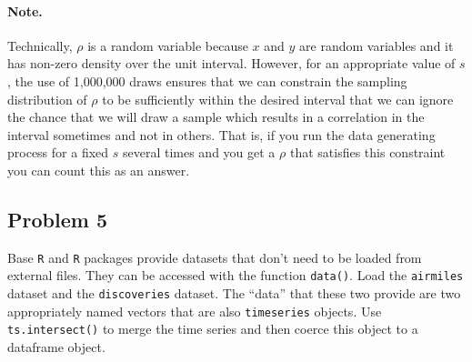\documentclass[10pt,letterpaper]{article}
\begin{document}
\paragraph{Note.} Technically, $\rho$ is a random variable because $x$
and $y$ are random variables and it has non-zero density over the unit
interval. However, for an appropriate value of $s$, the use of
1,000,000 draws ensures that we can constrain the sampling
distribution of $\rho$ to be sufficiently within the desired interval
that we can ignore the chance that we will draw a sample which results
in a correlation in the interval sometimes and not in others. That is,
if you run the data generating process for a fixed $s$ several times
and you get a $\rho$ that satisfies this constraint you can count this
as an answer.



\subsection*{Problem 5}
Base \texttt{R} and \texttt{R} packages provide datasets that don't
need to be loaded from external files. They can be accessed with the
function \texttt{data()}. Load the \texttt{airmiles} dataset and the
\texttt{discoveries} dataset. The ``data'' that these two provide are
two appropriately named vectors that are also \texttt{timeseries}
objects. Use \verb=ts.intersect()= to merge the time series and then
coerce this object to a dataframe object.
\end{document}
